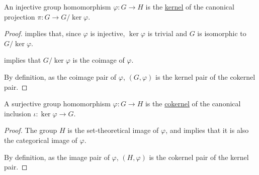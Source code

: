 \begin{corollary}\label{thm:injective_group_homomorphisms_are_kernels}
  An injective group homomorphism \( \varphi: G \to H \) is the \hyperref[def:zero_morphisms/kernel]{kernel} of the canonical projection \( \pi: G \to G / \ker \varphi \).
\end{corollary}
\begin{proof}
   implies that, since \( \varphi \) is injective, \( \ker \varphi \) is trivial and \( G \) is isomorphic to \( G / \ker \varphi \).

   implies that \( G / \ker \varphi \) is the coimage of \( \varphi \).

  By definition, as the coimage pair of \( \varphi \), \( (G, \varphi) \) is the kernel pair of the cokernel pair.
\end{proof}

\begin{corollary}\label{thm:surjective_group_homomorphisms_are_cokernels}
  A surjective group homomorphism \( \varphi: G \to H \) is the \hyperref[def:zero_morphisms/cokernel]{cokernel} of the canonical inclusion \( \iota: \ker \varphi \to G \).
\end{corollary}
\begin{proof}
  The group \( H \) is the set-theoretical image of \( \varphi \), and  implies that it is also the categorical image of \( \varphi \).

  By definition, as the image pair of \( \varphi \), \( (H, \varphi) \) is the cokernel pair of the kernel pair.
\end{proof}

